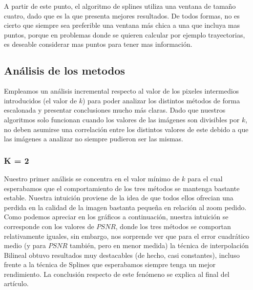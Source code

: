 A partir de este punto, el algoritmo de splines utiliza una ventana de tamaño cuatro, dado que es la que presenta mejores resultados.
De todos formas, no es cierto que siempre sea preferible una ventana más chica a una que incluya mas puntos, porque en problemas donde se quieren calcular por ejemplo trayectorias, es deseable considerar mas puntos para tener mas información.

\subsection{Análisis de los metodos}

Empleamos un análisis incremental respecto al valor de los pixeles intermedios introducidos (el valor de $k$) para poder analizar los distintos métodos de forma escalonada y presentar conclusiones mucho más claras. Dado que nuestros algoritmos solo funcionan cuando los valores de las imágenes son divisibles por $k$, no deben asumirse una correlación entre los distintos valores de este debido a que las imágenes a analizar no siempre pudieron ser las mismas.

\subsubsection{K = 2}
Nuestro primer análisis se concentra en el valor mínimo de $k$ para el cual esperabamos que el comportamiento de los tres métodos se mantenga bastante estable. Nuestra intuición proviene de la idea de que todos ellos ofrecian una perdida en la calidad de la imagen bastanta pequeña en relación al zoom pedido.
Como podemos apreciar en los gráficos a continuación, nuestra intuición se corresponde con los valores de $PSNR$, donde los tres métodos se comportan relativamente iguales, sin embargo, nos sorprende ver que para el error cuadrático medio (y para $PSNR$ también, pero en menor medida) la técnica de interpolación Bilineal obtuvo resultados muy destacables (de hecho, casi constantes), incluso frente a la técnica de Splines que esperabamos siempre tenga un mejor rendimiento. La conclusión respecto de este fenómeno se explica al final del artículo.

